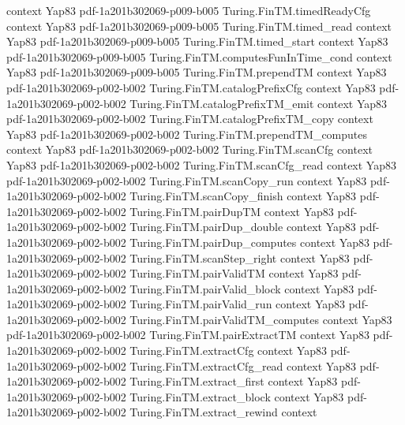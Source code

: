 \begin{theorem}
  {context}
  {Yap83}
  {pdf-1a201b302069-p009-b005}
\proofstep
  {Turing.FinTM.timedReadyCfg}
  {context}
  {Yap83}
  {pdf-1a201b302069-p009-b005}
\proofstep
  {Turing.FinTM.timed_read}
  {context}
  {Yap83}
  {pdf-1a201b302069-p009-b005}
\proofstep
  {Turing.FinTM.timed_start}
  {context}
  {Yap83}
  {pdf-1a201b302069-p009-b005}
\proofstep
  {Turing.FinTM.computesFunInTime_cond}
  {context}
  {Yap83}
  {pdf-1a201b302069-p009-b005}
\proofstep
  {Turing.FinTM.prependTM}
  {context}
  {Yap83}
  {pdf-1a201b302069-p002-b002}
\proofstep
  {Turing.FinTM.catalogPrefixCfg}
  {context}
  {Yap83}
  {pdf-1a201b302069-p002-b002}
\proofstep
  {Turing.FinTM.catalogPrefixTM_emit}
  {context}
  {Yap83}
  {pdf-1a201b302069-p002-b002}
\proofstep
  {Turing.FinTM.catalogPrefixTM_copy}
  {context}
  {Yap83}
  {pdf-1a201b302069-p002-b002}
\proofstep
  {Turing.FinTM.prependTM_computes}
  {context}
  {Yap83}
  {pdf-1a201b302069-p002-b002}
\proofstep
  {Turing.FinTM.scanCfg}
  {context}
  {Yap83}
  {pdf-1a201b302069-p002-b002}
\proofstep
  {Turing.FinTM.scanCfg_read}
  {context}
  {Yap83}
  {pdf-1a201b302069-p002-b002}
\proofstep
  {Turing.FinTM.scanCopy_run}
  {context}
  {Yap83}
  {pdf-1a201b302069-p002-b002}
\proofstep
  {Turing.FinTM.scanCopy_finish}
  {context}
  {Yap83}
  {pdf-1a201b302069-p002-b002}
\proofstep
  {Turing.FinTM.pairDupTM}
  {context}
  {Yap83}
  {pdf-1a201b302069-p002-b002}
\proofstep
  {Turing.FinTM.pairDup_double}
  {context}
  {Yap83}
  {pdf-1a201b302069-p002-b002}
\proofstep
  {Turing.FinTM.pairDup_computes}
  {context}
  {Yap83}
  {pdf-1a201b302069-p002-b002}
\proofstep
  {Turing.FinTM.scanStep_right}
  {context}
  {Yap83}
  {pdf-1a201b302069-p002-b002}
\proofstep
  {Turing.FinTM.pairValidTM}
  {context}
  {Yap83}
  {pdf-1a201b302069-p002-b002}
\proofstep
  {Turing.FinTM.pairValid_block}
  {context}
  {Yap83}
  {pdf-1a201b302069-p002-b002}
\proofstep
  {Turing.FinTM.pairValid_run}
  {context}
  {Yap83}
  {pdf-1a201b302069-p002-b002}
\proofstep
  {Turing.FinTM.pairValidTM_computes}
  {context}
  {Yap83}
  {pdf-1a201b302069-p002-b002}
\proofstep
  {Turing.FinTM.pairExtractTM}
  {context}
  {Yap83}
  {pdf-1a201b302069-p002-b002}
\proofstep
  {Turing.FinTM.extractCfg}
  {context}
  {Yap83}
  {pdf-1a201b302069-p002-b002}
\proofstep
  {Turing.FinTM.extractCfg_read}
  {context}
  {Yap83}
  {pdf-1a201b302069-p002-b002}
\proofstep
  {Turing.FinTM.extract_first}
  {context}
  {Yap83}
  {pdf-1a201b302069-p002-b002}
\proofstep
  {Turing.FinTM.extract_block}
  {context}
  {Yap83}
  {pdf-1a201b302069-p002-b002}
\proofstep
  {Turing.FinTM.extract_rewind}
  {context}

\end{theorem}
